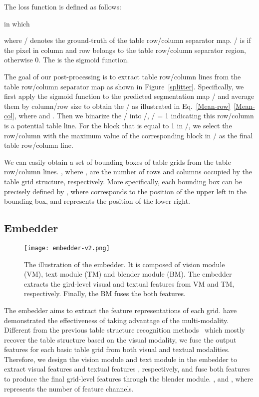 \documentclass[review]{elsarticle}
\begin{document}
The loss function is defined as follows:

in which

where / denotes the ground-truth of the table row/column separator map. / is  if the pixel in  column and  row belongs to the table row/column separator region, otherwise 0. The  is the sigmoid function.


The goal of our post-processing is to extract table row/column lines from the table row/column separator map as shown in Figure~\ref{splitter}. Specifically, we first apply the sigmoid function to the predicted segmentation map / and average them by column/row size to obtain the / as illustrated in Eq.~\ref{Mean-row}~\ref{Mean-col}, where  and . Then we binarize the / into /, / = 1 indicating this row/column is a potential table line. For the block that is equal to 1 in /, we select the row/column with the maximum value of the corresponding block in / as the final table row/column line.


We can easily obtain a set of bounding boxes  of table grids from the table row/column lines. , where ,  are the number of rows and columns occupied by the table grid structure, respectively. More specifically, each bounding box can be precisely defined by , where  corresponds to the position of the upper left in the bounding box, and  represents the position of the lower right. 

\subsection{Embedder}

\begin{figure*}[htb]
	\centerline{\texttt{[image: embedder-v2.png]}}
	\caption{The illustration of the embedder. It is composed of vision module (VM), text module (TM) and blender module (BM). The embedder extracts the gird-level visual and textual features from VM and TM, respectively. Finally, the BM fuses the both features.}
	\label{embedder}
\end{figure*}

The embedder aims to extract the feature representations of each grid. \cite{ImageCaption-DVSA, VQA-M4C} have demonstrated the effectiveness of taking advantage of the multi-modality. Different from the previous table structure recognition methods~\cite{EDD,TabStructNet,SPLERGE} which mostly recover the table structure based on the visual modality, we fuse the output features for each basic table grid from both visual and textual modalities. Therefore, we design the vision module and text module in the embedder to extract visual features  and textual features , respectively, and fuse both features to produce the final grid-level features  through the blender module. ,  and , where  represents the number of feature channels. 
\end{document}
